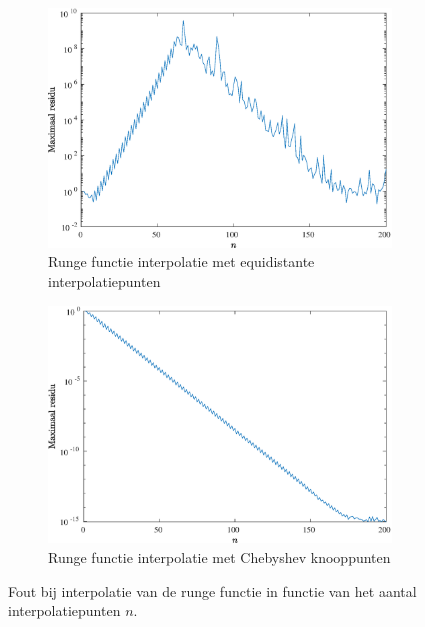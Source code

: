 \documentclass[a4paper, 12pt, titlepage, fleqn]{article}
\begin{document}
\begin{figure}
\begin{subfigure}[b]{0.45\textwidth}
\includegraphics[width=\linewidth]{../Afbeeldingen/runge_equi_fout.eps}
\caption{Runge functie interpolatie met equidistante interpolatiepunten}
\end{subfigure}
\hfill
\begin{subfigure}[b]{0.45\textwidth}
\includegraphics[width=\linewidth]{../Afbeeldingen/runge_nul_fout.eps}
\caption{Runge functie interpolatie met Chebyshev knooppunten}
\label{rungeNulFout}
\end{subfigure}
\caption[Maximale fout bij Runge interpolatie]{Fout bij interpolatie van de runge functie in functie van het aantal interpolatiepunten $n$.}
\label{fig:rungeFout}
\end{figure}
\end{document}
